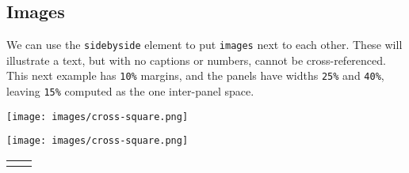 \documentclass[10pt,]{article}
\theoremstyle{plain}
\theoremstyle{definition}
\theoremstyle{definition}
\theoremstyle{definition}
\theoremstyle{definition}
\theoremstyle{definition}
\theoremstyle{definition}
\numberwithin{equation}{section}
\newlength{\panelmax}
\begin{document}
\subsection[{Images}]{Images}\label{subsection-37}
\hypertarget{p-654}{}%
We can use the \lstinline?sidebyside? element to put \lstinline?images? next to each other.  These will illustrate a text, but with no captions or numbers, cannot be cross-referenced.  This next example has \lstinline?10%? margins, and the panels have widths \lstinline?25%? and \lstinline?40%?, leaving \lstinline?15%? computed as the one inter-panel space.%
{%
\setlength{\panelmax}{0pt}
\ifdefined\panelboxAimage\else\newsavebox{\panelboxAimage}\fi%
\begin{lrbox}{\panelboxAimage}
\texttt{[image: images/cross-square.png]}
\end{lrbox}
\ifdefined\phAimage\else\newlength{\phAimage}\fi%
\setlength{\phAimage}{\ht\panelboxAimage+\dp\panelboxAimage}
\settototalheight{\phAimage}{\usebox{\panelboxAimage}}
\setlength{\panelmax}{\maxof{\panelmax}{\phAimage}}
\ifdefined\panelboxBimage\else\newsavebox{\panelboxBimage}\fi%
\begin{lrbox}{\panelboxBimage}
\texttt{[image: images/cross-square.png]}
\end{lrbox}
\ifdefined\phBimage\else\newlength{\phBimage}\fi%
\setlength{\phBimage}{\ht\panelboxBimage+\dp\panelboxBimage}
\settototalheight{\phBimage}{\usebox{\panelboxBimage}}
\setlength{\panelmax}{\maxof{\panelmax}{\phBimage}}
\leavevmode%
\setlength{\tabcolsep}{0.075\linewidth}
\par\medskip\noindent
\hspace*{0.1\linewidth}%
\begin{tabular}{@{}*{2}{c}@{}}
\begin{minipage}[c][\panelmax][t]{0.25\linewidth}\usebox{\panelboxAimage}\end{minipage}&
\begin{minipage}[c][\panelmax][t]{0.4\linewidth}\usebox{\panelboxBimage}\end{minipage}\end{tabular}\\
}%
\end{document}
